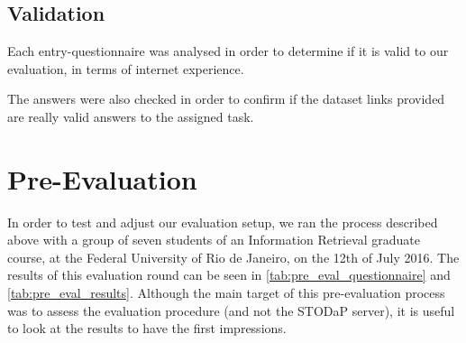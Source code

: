 \subsection{Validation}
Each entry-questionnaire was analysed in order to determine if it is valid to our evaluation, in terms of internet experience.

The answers were also checked in order to confirm if the dataset links provided are really valid answers to the assigned task.


\section{Pre-Evaluation}
\label{sec:pre_evaluation}

In order to test and adjust our evaluation setup, we ran the process described above with a group of seven students of an Information Retrieval graduate course, at the Federal University of Rio de Janeiro, on the 12th of July 2016.
The results of this evaluation round can be seen in \autoref{tab:pre_eval_questionnaire} and \autoref{tab:pre_eval_results}.
Although the main target of this pre-evaluation process was to assess the evaluation procedure (and not the STODaP server), it is useful to look at the results to have the first impressions.

